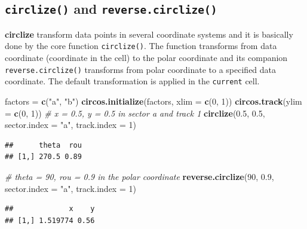 \documentclass[]{book}
\newenvironment{Shaded}{\begin{snugshade}}{\end{snugshade}}
\newcommand{\KeywordTok}[1]{\textcolor[rgb]{0.13,0.29,0.53}{\textbf{#1}}}
\newcommand{\DataTypeTok}[1]{\textcolor[rgb]{0.13,0.29,0.53}{#1}}
\newcommand{\DecValTok}[1]{\textcolor[rgb]{0.00,0.00,0.81}{#1}}
\newcommand{\FloatTok}[1]{\textcolor[rgb]{0.00,0.00,0.81}{#1}}
\newcommand{\StringTok}[1]{\textcolor[rgb]{0.31,0.60,0.02}{#1}}
\newcommand{\CommentTok}[1]{\textcolor[rgb]{0.56,0.35,0.01}{\textit{#1}}}
\newcommand{\NormalTok}[1]{#1}
\theoremstyle{definition}
\theoremstyle{definition}
\theoremstyle{remark}
\begin{document}
\subsection{\texorpdfstring{\texttt{circlize()} and
\texttt{reverse.circlize()}}{circlize() and reverse.circlize()}}\label{circlize_and_reverse_circlize}

\textbf{circlize} transform data points in several coordinate systems
and it is basically done by the core function \texttt{circlize()}. The
function transforms from data coordinate (coordinate in the cell) to the
polar coordinate and its companion \texttt{reverse.circlize()}
transforms from polar coordinate to a specified data coordinate. The
default transformation is applied in the \texttt{current} cell.

\begin{Shaded}
\begin{Highlighting}[]
\NormalTok{factors =}\StringTok{ }\KeywordTok{c}\NormalTok{(}\StringTok{"a"}\NormalTok{, }\StringTok{"b"}\NormalTok{)}
\KeywordTok{circos.initialize}\NormalTok{(factors, }\DataTypeTok{xlim =} \KeywordTok{c}\NormalTok{(}\DecValTok{0}\NormalTok{, }\DecValTok{1}\NormalTok{))}
\KeywordTok{circos.track}\NormalTok{(}\DataTypeTok{ylim =} \KeywordTok{c}\NormalTok{(}\DecValTok{0}\NormalTok{, }\DecValTok{1}\NormalTok{))}
\CommentTok{# x = 0.5, y = 0.5 in sector a and track 1}
\KeywordTok{circlize}\NormalTok{(}\FloatTok{0.5}\NormalTok{, }\FloatTok{0.5}\NormalTok{, }\DataTypeTok{sector.index =} \StringTok{"a"}\NormalTok{, }\DataTypeTok{track.index =} \DecValTok{1}\NormalTok{)}
\end{Highlighting}
\end{Shaded}

\begin{verbatim}
##      theta  rou
## [1,] 270.5 0.89
\end{verbatim}

\begin{Shaded}
\begin{Highlighting}[]
\CommentTok{# theta = 90, rou = 0.9 in the polar coordinate}
\KeywordTok{reverse.circlize}\NormalTok{(}\DecValTok{90}\NormalTok{, }\FloatTok{0.9}\NormalTok{, }\DataTypeTok{sector.index =} \StringTok{"a"}\NormalTok{, }\DataTypeTok{track.index =} \DecValTok{1}\NormalTok{)}
\end{Highlighting}
\end{Shaded}

\begin{verbatim}
##             x    y
## [1,] 1.519774 0.56
\end{verbatim}
\end{document}
